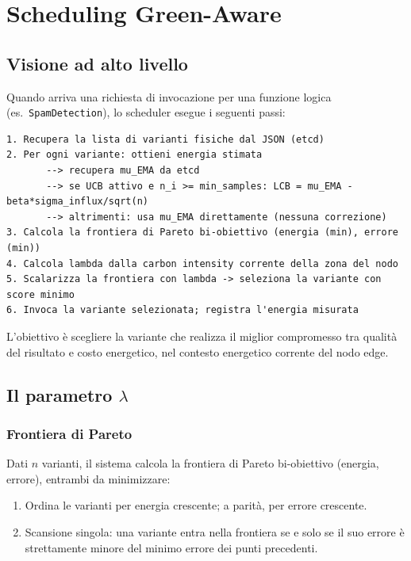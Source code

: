 \documentclass[a4paper,11pt]{article}
\begin{document}
\section{Scheduling Green-Aware}

\subsection{Visione ad alto livello}

Quando arriva una richiesta di invocazione per una funzione logica
(es.\ \texttt{SpamDetection}), lo scheduler esegue i seguenti passi:

\begin{lstlisting}
1. Recupera la lista di varianti fisiche dal JSON (etcd)
2. Per ogni variante: ottieni energia stimata
       --> recupera mu_EMA da etcd
       --> se UCB attivo e n_i >= min_samples: LCB = mu_EMA - beta*sigma_influx/sqrt(n)
       --> altrimenti: usa mu_EMA direttamente (nessuna correzione)
3. Calcola la frontiera di Pareto bi-obiettivo (energia (min), errore (min))
4. Calcola lambda dalla carbon intensity corrente della zona del nodo
5. Scalarizza la frontiera con lambda -> seleziona la variante con score minimo
6. Invoca la variante selezionata; registra l'energia misurata
\end{lstlisting}

L'obiettivo è scegliere la variante che realizza il miglior compromesso tra qualità del
risultato e costo energetico, nel contesto energetico corrente del nodo edge.

\subsection{Il parametro \texorpdfstring{$\lambda$}{lambda}}

\subsubsection*{Frontiera di Pareto}

Dati $n$ varianti, il sistema calcola la frontiera di Pareto bi-obiettivo
(energia, errore), entrambi da minimizzare:

\begin{enumerate}
  \item Ordina le varianti per energia crescente; a parità, per errore crescente.
  \item Scansione singola: una variante entra nella frontiera se e solo se il suo
    errore è strettamente minore del minimo errore dei punti precedenti.
\end{enumerate}
\end{document}
